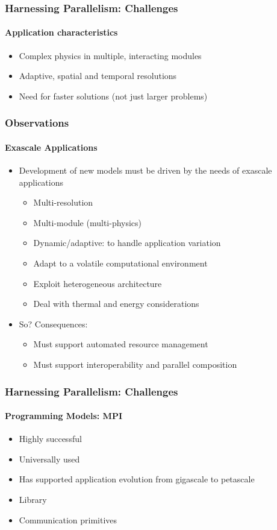 \begin{frame}[fragile]
\frametitle{Harnessing Parallelism: Challenges}
\framesubtitle{Application characteristics}
  \begin{itemize}
  \item Complex physics in multiple, interacting modules
  \item Adaptive, spatial and temporal resolutions
  \item Need for faster solutions (not just larger problems)
  \end{itemize}
\end{frame}

\begin{frame}[t]
\frametitle{Observations}
\framesubtitle{Exascale Applications}
  \begin{itemize}
    \item Development of new models must be driven by the needs of exascale applications
    \begin{itemize}
      \item Multi-resolution
      \item Multi-module (multi-physics)
      \item Dynamic/adaptive: to handle application variation
      \item Adapt to a volatile computational environment
      \item Exploit heterogeneous architecture
      \item Deal with thermal and energy considerations
    \end{itemize}
    \pause
    \item So? Consequences:
    \begin{itemize}
      \item Must support automated resource management
      \item Must support interoperability and parallel composition
    \end{itemize}
  \end{itemize}
\end{frame}

\begin{frame}[t]
\frametitle{Harnessing Parallelism: Challenges}
\framesubtitle{Programming Models: MPI}
  \begin{itemize}
    \item Highly successful
    \item Universally used
    \item Has supported application evolution from gigascale to petascale
  \end{itemize}
  \begin{itemize}
    \item Library
    \item Communication primitives
  \end{itemize}
\end{frame}

